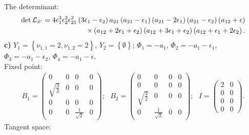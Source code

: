 \documentclass[a4paper,12pt]{article}
\begin{document}
The determinant:
\begin{eqnarray}
\det {\cal L}_{{\tilde x}'}=4 \epsilon_1^3 \epsilon_2^2
\epsilon_{21}^2 \left(3 \epsilon_1 -\epsilon_2 \right)a_{21}
\left(a_{21}-\epsilon_1 \right) \left(a_{21}-2 \epsilon_1
\right)\left(a_{21}-\epsilon_2
\right)\left(a_{12}+\epsilon \right) \nonumber \\
\times \left(a_{12}+2\epsilon_1 +\epsilon_2 \right)\left(a_{12}+3\epsilon_1 +\epsilon_2
\right)\left(a_{12}+\epsilon_1 +2\epsilon_2 \right).
\end{eqnarray}
{\bf c)} $Y_1=\left\{\nu_{1,1}=2, \nu_{1,2}=2 \right\}$,
$Y_2=\left\{\emptyset\right\}$; $\Phi_1=-a_1$,
$\Phi_2=-a_1-\epsilon_1$,
$\Phi_3=-a_1-\epsilon_2$, $\Phi_4=-a_1-\epsilon$. \\
Fixed point:
\begin{eqnarray}
B_1=\left(\begin{array}{cccc} 0 & 0 & 0 & 0 \\ \sqrt{\frac{3}{2}} & 0 & 0 & 0 \\ 0 & 0 & 0 & 0 \\
0 & 0 & \frac{1}{\sqrt{2}} & 0
\end{array}\right); \, \, \, \,
B_2=\left(\begin{array}{cccc} 0 & 0 & 0 & 0 \\ 0 & 0 & 0 & 0  \\ \sqrt{\frac{3}{2}} & 0 & 0 & 0 \\
0 & \frac{1}{\sqrt{2}} & 0 & 0
\end{array}\right);
\, \, \, \, I=\left(\begin{array}{cc} 2 & 0 \\ 0 & 0 \\0 & 0 \\ 0 & 0
\end{array}\right).
\end{eqnarray}
Tangent space:
\end{document}
